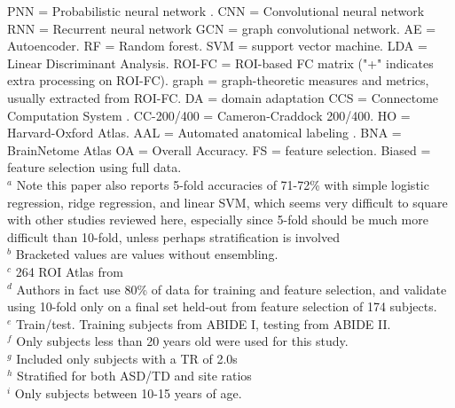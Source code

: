 \documentclass[10pt]{article}
\begin{document}
\begin{landscape}
\begin{table}
{    PNN = Probabilistic neural network \citep{spechtProbabilisticNeuralNetworks1990}.
    CNN = Convolutional neural network
    RNN = Recurrent neural network
    GCN = graph convolutional network.
    AE = Autoencoder. RF = Random forest. SVM = support vector machine.
    LDA = Linear Discriminant Analysis.
    ROI-FC = ROI-based FC matrix ("+" indicates extra processing on ROI-FC).
    graph = graph-theoretic measures and metrics, usually extracted from ROI-FC.
    DA = domain adaptation
    CCS = Connectome Computation System \citep{xuConnectomeComputationSystem2015}.
    CC-200/400 = Cameron-Craddock 200/400.
    HO = Harvard-Oxford Atlas.
    AAL = Automated anatomical labeling \citep{tzourio-mazoyerAutomatedAnatomicalLabeling2002}.
    BNA = BrainNetome Atlas \citep{fanHumanBrainnetomeAtlas2016}
    OA = Overall Accuracy.
    FS = feature selection.
    Biased = feature selection using full data.
    \\\hspace{\textheight} \(^a\) Note this paper also reports 5-fold accuracies of 71-72\% with simple
    logistic regression, ridge regression, and linear SVM, which seems very difficult to square with
    other studies reviewed here, especially since 5-fold should be much more difficult than 10-fold,
    unless perhaps stratification is involved
    \\\hspace{\textheight} \(^b\) Bracketed values are values without ensembling.
    \\\hspace{\textheight} \(^c\) 264 ROI Atlas from \citep{powerFunctionalNetworkOrganization2011}
    \\\hspace{\textheight} \(^d\) Authors in fact use 80\% of data for training and feature selection,
    and validate using 10-fold only on a final set held-out from feature selection of 174 subjects.
    \\\hspace{\textheight} \(^e\) Train/test. Training subjects from ABIDE I, testing from ABIDE II.
    \\\hspace{\textheight} \(^f\) Only subjects less than 20 years old were used for this study.
    \\\hspace{\textheight} \(^g\) Included only subjects with a TR of 2.0s
    \\\hspace{\textheight} \(^h\) Stratified for both ASD/TD and site ratios
    \\\hspace{\textheight} \(^i\) Only subjects between 10-15 years of age.
  }
  \normalsize
\end{table}
\end{landscape}
\end{document}
